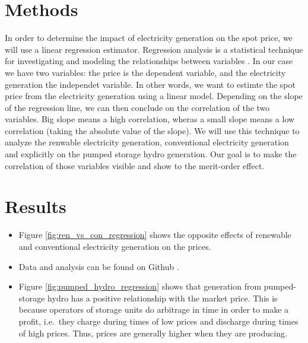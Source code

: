 \documentclass{article}
\begin{document}
\section{Methods}

In order to determine the impact of electricity generation on the spot price, we will use a linear regression estimator. 
Regression analysis is a statistical technique for investigating and modeling the relationships between variables \citep{montgomery2021introduction}. 
In our case we have two variables: the price is the dependent variable, and the electricity generation the independet variable. 
In other words, we want to estimte the spot price from the electricity generation using a linear model.
Depending on the slope of the regression line, we can then conclude on the  correlation of the two variables. 
Big slope means a high correlation, wheras a small slope means a low correlation (taking the absolute value of the slope). We will use this technique to analyze the renwable electricity generation, conventional electricity generation and explicitly on the pumped storage hydro generation. 
Our goal is to make the correlation of those variables visible and show to the merit-order effect. 


\section{Results}

\begin{itemize}
    \item Figure \ref{fig:ren_vs_con_regression} shows the opposite effects of renewable and conventional electricity generation on the prices.
    \item Data and analysis can be found on Github \citep{github_repo}.
    \item Figure \ref{fig:pumped_hydro_regression} shows that generation from pumped-storage hydro has a positive relationship with the market price.
    This is because operators of storage units do arbitrage in time in order to make a profit, i.e.\ they charge during times of low prices and discharge during times of high prices.
    Thus, prices are generally higher when they are producing.
\end{itemize}
\end{document}
